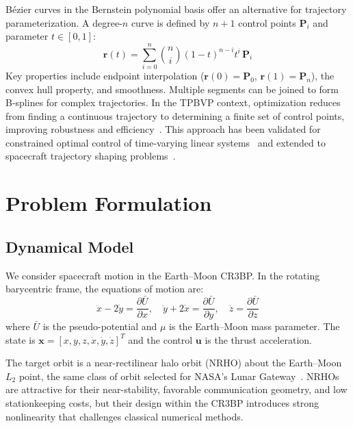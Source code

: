\documentclass[11pt]{article}
\begin{document}
B\'{e}zier curves in the Bernstein polynomial basis offer an alternative for trajectory parameterization. A degree-$n$ curve is defined by $n+1$ control points $\mathbf{P}_i$ and parameter $t \in [0,1]$:
\begin{equation}
\mathbf{r}(t) = \sum_{i=0}^{n} \binom{n}{i} (1-t)^{n-i} t^{i} \, \mathbf{P}_i
\end{equation}
Key properties include endpoint interpolation ($\mathbf{r}(0) = \mathbf{P}_0$, $\mathbf{r}(1) = \mathbf{P}_n$), the convex hull property, and smoothness. Multiple segments can be joined to form B-splines for complex trajectories. In the TPBVP context, optimization reduces from finding a continuous trajectory to determining a finite set of control points, improving robustness and efficiency~\cite{howell2016spline, shin2024bezier}. This approach has been validated for constrained optimal control of time-varying linear systems~\cite{ghomanjani2012bezier} and extended to spacecraft trajectory shaping problems~\cite{fan2020bezier, cichella2021optimal}.

\section{Problem Formulation}

\subsection{Dynamical Model}

We consider spacecraft motion in the Earth--Moon CR3BP. In the rotating barycentric frame, the equations of motion are:
\begin{equation}
\ddot{x} - 2\dot{y} = \frac{\partial \bar{U}}{\partial x}, \quad
\ddot{y} + 2\dot{x} = \frac{\partial \bar{U}}{\partial y}, \quad
\ddot{z} = \frac{\partial \bar{U}}{\partial z}
\end{equation}
where $\bar{U}$ is the pseudo-potential and $\mu$ is the Earth--Moon mass parameter. The state is $\mathbf{x} = [x, y, z, \dot{x}, \dot{y}, \dot{z}]^T$ and the control $\mathbf{u}$ is the thrust acceleration.

The target orbit is a near-rectilinear halo orbit (NRHO) about the Earth--Moon $L_2$ point, the same class of orbit selected for NASA's Lunar Gateway~\cite{zimovan2017near}. NRHOs are attractive for their near-stability, favorable communication geometry, and low stationkeeping costs, but their design within the CR3BP introduces strong nonlinearity that challenges classical numerical methods.
\end{document}
